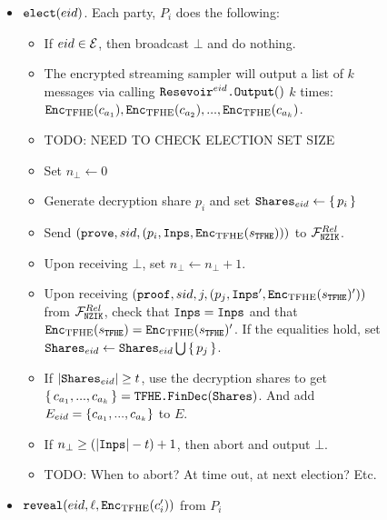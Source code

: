 \begin{figure}
{\begin{minipage}{1\textwidth}
\begin{itemize}
				\item $\texttt{elect}({eid})$. Each party, $P_i$ does the following:
				      \begin{itemize}
					      \item If ${eid} \in \mathcal{E}$, then broadcast $\bot$ and do nothing.
					      \item The encrypted streaming sampler will output a list of $k$ messages via calling $\texttt{Resevoir}^{{eid}}\texttt{.Output}()$ $k$ times: $\texttt{Enc}_{\mathrm{TFHE}}(c_{a_1}), \texttt{Enc}_{\mathrm{TFHE}}(c_{a_2}), ..., \texttt{Enc}_{\mathrm{TFHE}}(c_{a_k})$.
								\item TODO: NEED TO CHECK ELECTION SET SIZE
								\item Set $n_\bot \gets 0$
								\item Generate decryption share $p_i$ and set $\texttt{Shares}_{eid} \gets \set{p_i}$
								\item Send $(\texttt{prove}, sid, (p_i, \texttt{Inps}, \texttt{Enc}_{\mathrm{TFHE}}(s_{\texttt{TFHE}})))$ to $\mathcal{F}_{\texttt{NZIK}}^{Rel}$.
								\item Upon receiving $\bot$, set $n_\bot \gets n_\bot + 1$.
								\item Upon receiving $(\texttt{proof}, sid, j, (p_j, \texttt{Inps}', \texttt{Enc}_{\mathrm{TFHE}}(s_{\texttt{TFHE}})'))$ from $\mathcal{F}_{\texttt{NZIK}}^{Rel}$,
								check that $\texttt{Inps} = \texttt{Inps}$ and that $\texttt{Enc}_{\mathrm{TFHE}}(s_{\texttt{TFHE}}) = \texttt{Enc}_{\mathrm{TFHE}}(s_{\texttt{TFHE}})'$.
								If the equalities hold, set $\texttt{Shares}_{eid} \gets \texttt{Shares}_{eid} \bigcup \set{p_j}$.
								\item If $|\texttt{Shares}_{eid}| \geq t$, use the decryption shares to get $\set{c_{a_1}, ..., c_{a_k}} = \texttt{TFHE.FinDec}(\texttt{Shares})$.
								And add $E_{eid} = \left\{c_{a_1}, ..., c_{a_k}\right\}$ to $E$.
								\item If $n_\bot \geq (|\texttt{Inps}| - t) + 1$, then abort and output $\bot$.
					      \item TODO: When to abort? At time out, at next election? Etc.
				      \end{itemize}
				\item $\texttt{reveal}({eid}, \ell, \texttt{Enc}_{\mathrm{TFHE}}(c'_i))$ from $P_i$
				      \begin{itemize}

\end{itemize}
\end{itemize}
\end{minipage}}
\end{figure}
